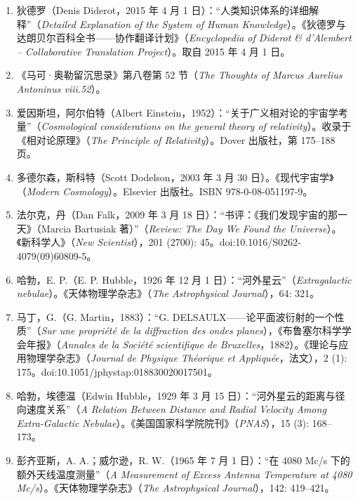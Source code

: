 \begin{enumerate}
\item 狄德罗（Denis Diderot，2015 年 4 月 1 日）：“人类知识体系的详细解释”（\emph{Detailed Explanation of the System of Human Knowledge}）。《狄德罗与达朗贝尔百科全书——协作翻译计划》（\emph{Encyclopedia of Diderot & d'Alembert – Collaborative Translation Project}）。取自 2015 年 4 月 1 日。  

\item 《马可·奥勒留沉思录》第八卷第 52 节（\emph{The Thoughts of Marcus Aurelius Antoninus viii.52}）。  

\item 爱因斯坦，阿尔伯特（Albert Einstein，1952）：“关于广义相对论的宇宙学考量”（\emph{Cosmological considerations on the general theory of relativity}）。收录于《相对论原理》（\emph{The Principle of Relativity}）。Dover 出版社，第 175–188 页。  

\item 多德尔森，斯科特（Scott Dodelson，2003 年 3 月 30 日）。《现代宇宙学》（\emph{Modern Cosmology}）。Elsevier 出版社。ISBN 978-0-08-051197-9。  

\item 法尔克，丹（Dan Falk，2009 年 3 月 18 日）：“书评：《我们发现宇宙的那一天》（Marcia Bartusiak 著）”（\emph{Review: The Day We Found the Universe}）。《新科学人》（\emph{New Scientist}），201 (2700): 45。doi:10.1016/S0262-4079(09)60809-5。  

\item 哈勃，E. P.（E. P. Hubble，1926 年 12 月 1 日）：“河外星云”（\emph{Extragalactic nebulae}）。《天体物理学杂志》（\emph{The Astrophysical Journal}），64: 321。  

\item 马丁，G.（G. Martin，1883）：“G. DELSAULX——论平面波衍射的一个性质”（\emph{Sur une propriété de la diffraction des ondes planes}），《布鲁塞尔科学学会年报》（\emph{Annales de la Société scientifique de Bruxelles}，1882）。《理论与应用物理学杂志》（\emph{Journal de Physique Théorique et Appliquée}，法文），2 (1): 175。doi:10.1051/jphystap:018830020017501。  

\item 哈勃，埃德温（Edwin Hubble，1929 年 3 月 15 日）：“河外星云的距离与径向速度关系”（\emph{A Relation Between Distance and Radial Velocity Among Extra-Galactic Nebulae}）。《美国国家科学院院刊》（\emph{PNAS}），15 (3): 168–173。  

\item 彭齐亚斯，A. A.；威尔逊，R. W.（1965 年 7 月 1 日）：“在 4080 Mc/s 下的额外天线温度测量”（\emph{A Measurement of Excess Antenna Temperature at 4080 Mc/s}）。《天体物理学杂志》（\emph{The Astrophysical Journal}），142: 419–421。  


\end{enumerate}
